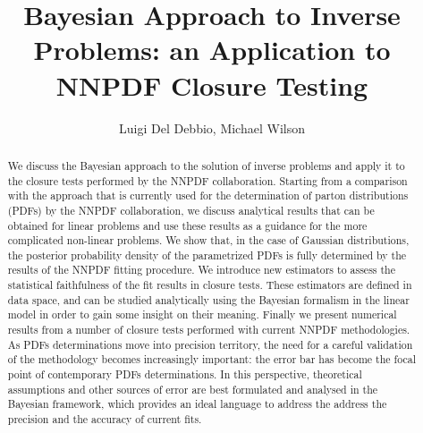 \documentclass[11pt]{article}
\title{Bayesian Approach to Inverse Problems: an Application to NNPDF Closure Testing}
\author{Luigi Del Debbio, Michael Wilson}
\begin{document}
\maketitle

\begin{abstract}
    We discuss the Bayesian approach to the solution of inverse problems and apply it to the
    closure tests performed by the NNPDF collaboration. Starting from a comparison with
    the approach that is currently used for the determination of parton distributions 
    (PDFs) by the NNPDF collaboration, we discuss analytical results that can be obtained for 
    linear problems and use these results as a guidance for the more complicated non-linear problems. 
    We show that, in the case of Gaussian distributions, the posterior probability density
    of the parametrized PDFs is fully determined by the results of the NNPDF fitting procedure. 
    We introduce new estimators to assess the statistical faithfulness of the fit results in 
    closure tests. These estimators are defined in data space, and can be studied analytically 
    using the Bayesian formalism in the linear model in order to gain some insight on their
    meaning. Finally we present numerical results from a number of closure tests performed 
    with current NNPDF methodologies. As PDFs determinations move into precision territory, 
    the need for a careful validation of the methodology becomes increasingly important: the error
    bar has become the focal point of contemporary PDFs determinations. In this perspective,
    theoretical assumptions and other sources of error are best formulated and analysed
    in the Bayesian framework, which provides an ideal language to address the address the 
    precision and the accuracy of current fits. 

\end{abstract}





%



\appendix





\end{document}

